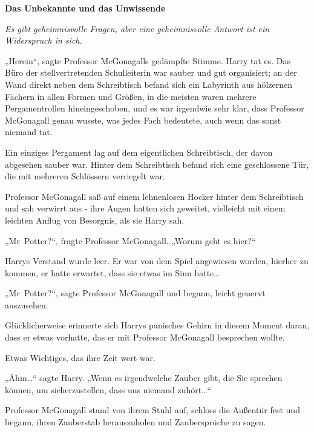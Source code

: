 

\hypertarget{das-unbekannte-und-das-unwissende}{%

\textbf{Das Unbekannte und das Unwissende}

\emph{Es gibt geheimnisvolle Fragen, aber eine geheimnisvolle Antwort ist ein Widerspruch in sich.}

„Herein“, sagte Professor McGonagalls gedämpfte Stimme. Harry tat es. Das Büro der stellvertretenden Schulleiterin war sauber und gut organisiert; an der Wand direkt neben dem Schreibtisch befand sich ein Labyrinth aus hölzernen Fächern in allen Formen und Größen, in die meisten waren mehrere Pergamentrollen hineingeschoben, und es war irgendwie sehr klar, dass Professor McGonagall genau wusste, was jedes Fach bedeutete, auch wenn das sonst niemand tat.

Ein einziges Pergament lag auf dem eigentlichen Schreibtisch, der davon abgesehen sauber war. Hinter dem Schreibtisch befand sich eine geschlossene Tür, die mit mehreren Schlössern verriegelt war.

Professor McGonagall saß auf einem lehnenlosen Hocker hinter dem Schreibtisch und sah verwirrt aus - ihre Augen hatten sich geweitet, vielleicht mit einem leichten Anflug von Besorgnis, als sie Harry sah.

„Mr~Potter?“, fragte Professor McGonagall. „Worum geht es hier?“

Harrys Verstand wurde leer. Er war von dem Spiel angewiesen worden, hierher zu kommen, er hatte erwartet, dass sie etwas im Sinn hatte…

„Mr~Potter?“, sagte Professor McGonagall und begann, leicht genervt auszusehen.

Glücklicherweise erinnerte sich Harrys panisches Gehirn in diesem Moment daran, dass er etwas vorhatte, das er mit Professor McGonagall besprechen wollte.

Etwas Wichtiges, das ihre Zeit wert war.

„Ähm…“ sagte Harry. „Wenn es irgendwelche Zauber gibt, die Sie sprechen können, um sicherzustellen, dass uns niemand zuhört…“

Professor McGonagall stand von ihrem Stuhl auf, schloss die Außentür fest und begann, ihren Zauberstab herauszuholen und Zaubersprüche zu sagen.

}
